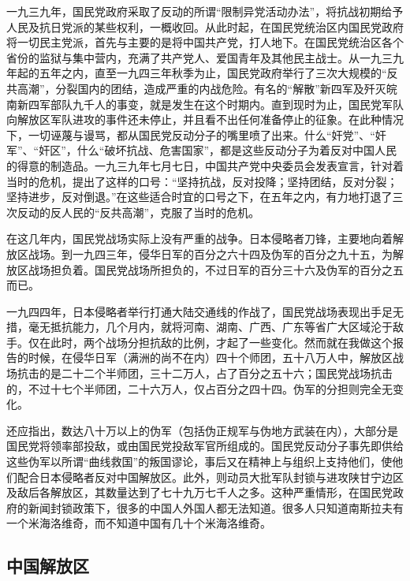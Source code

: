 一九三九年，国民党政府采取了反动的所谓“限制异党活动办法”，将抗战初期给予人民及抗日党派的某些权利，一概收回。从此时起，在国民党统治区内国民党政府将一切民主党派，首先与主要的是将中国共产党，打人地下。在国民党统治区各个省份的监狱与集中营内，充满了共产党人、爱国青年及其他民主战士。从一九三九年起的五年之内，直至一九四三年秋季为止，国民党政府举行了三次大规模的“反共高潮”，分裂国内的团结，造成严重的内战危险。有名的“解散”新四军及歼灭皖南新四军部队九千人的事变，就是发生在这个时期内。直到现时为止，国民党军队向解放区军队进攻的事件还未停止，并且看不出任何准备停止的征象。在此种情况下，一切诬蔑与谩骂，都从国民党反动分子的嘴里喷了出来。什么“奸党”、“奸军”、“奸区”，什么“破坏抗战、危害国家”，都是这些反动分子为着反对中国人民的得意的制造品。一九三九年七月七日，中国共产党中央委员会发表宣言，针对着当时的危机，提出了这样的口号：“坚持抗战，反对投降；坚持团结，反对分裂；坚持进步，反对倒退。”在这些适合时宜的口号之下，在五年之内，有力地打退了三次反动的反人民的“反共高潮”，克服了当时的危机。

在这几年内，国民党战场实际上没有严重的战争。日本侵略者刀锋，主要地向着解放区战场。到一九四三年，侵华日军的百分之六十四及伪军的百分之九十五，为解放区战场担负着。国民党战场所担负的，不过日军的百分三十六及伪军的百分之五而已。

一九四四年，日本侵略者举行打通大陆交通线的作战了，国民党战场表现出手足无措，毫无抵抗能力，几个月内，就将河南、湖南、广西、广东等省广大区域沦于敌手。仅在此时，两个战场分担抗敌的比例，才起了一些变化。然而就在我做这个报告的时候，在侵华日军（满洲的尚不在内）四十个师团，五十八万人中，解放区战场抗击的是二十二个半师团，三十二万人，占了百分之五十六；国民党战场抗击的，不过十七个半师团，二十六万人，仅占百分之四十四。伪军的分担则完全无变化。

还应指出，数达八十万以上的伪军（包括伪正规军与伪地方武装在内），大部分是国民党将领率部投敌，或由国民党投敌军官所组成的。国民党反动分子事先即供给这些伪军以所谓“曲线救国”的叛国谬论，事后又在精神上与组织上支持他们，使他们配合日本侵略者反对中国解放区。此外，则动员大批军队封锁与进攻陕甘宁边区及敌后各解放区，其数量达到了七十九万七千人之多。这种严重情形，在国民党政府的新闻封锁政策下，很多的中国人外国人都无法知道。很多人只知道南斯拉夫有一个米海洛维奇，而不知道中国有几十个米海洛维奇。

\subsection{中国解放区}

